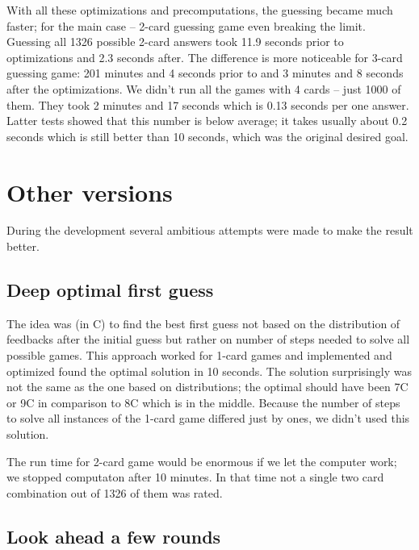 \documentclass{article}
\begin{document}
With all these optimizations and precomputations, the guessing became much faster; for the main case -- 2-card guessing game even breaking the limit.
Guessing all 1326 possible 2-card answers took 11.9 seconds prior to optimizations and 2.3 seconds after.
The difference is more noticeable for 3-card guessing game: 201 minutes and 4 seconds prior to and 3 minutes and 8 seconds after the optimizations.
We didn't run all the games with 4 cards -- just 1000 of them.
They took 2 minutes and 17 seconds which is 0.13 seconds per one answer.
Latter tests showed that this number is below average; it takes usually about 0.2 seconds which is still better than 10 seconds, which was the original desired goal.

\section{Other versions}

During the development several ambitious attempts were made to make the result better.

\subsection{Deep optimal first guess}

The idea was (in C) to find the best first guess not based on the distribution of feedbacks after the initial guess but rather on number of steps needed to solve all possible games.
This approach worked for 1-card games and implemented and optimized found the optimal solution in 10 seconds.
The solution surprisingly was not the same as the one based on distributions; the optimal should have been 7C or 9C in comparison to 8C which is in the middle.
Because the number of steps to solve all instances of the 1-card game differed just by ones, we didn't used this solution.

The run time for 2-card game would be enormous if we let the computer work; we stopped computaton after 10 minutes.
In that time not a single two card combination out of 1326 of them was rated.

\subsection{Look ahead a few rounds}
\end{document}
